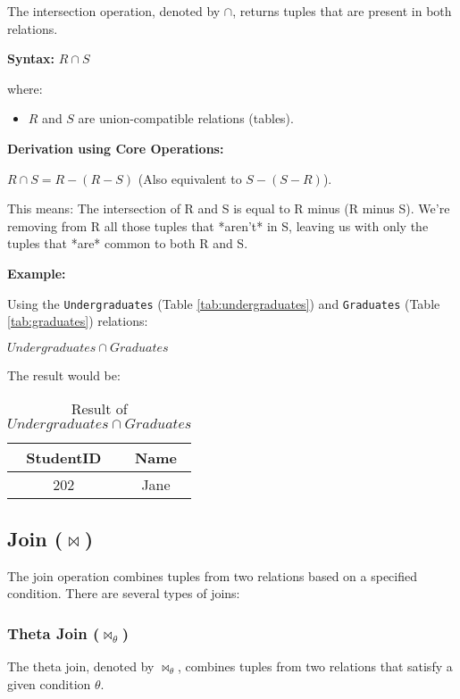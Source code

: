 \documentclass[12pt]{book}
\begin{document}
The intersection operation, denoted by $\cap$, returns tuples that are present in both relations.

\textbf{Syntax:} $\mathit{R} \cap \mathit{S}$

where:
\begin{itemize}
    \item $\mathit{R}$ and $\mathit{S}$ are union-compatible relations (tables).
\end{itemize}

\textbf{Derivation using Core Operations:}

$\mathit{R} \cap \mathit{S} = \mathit{R} - (\mathit{R} - \mathit{S})$
(Also equivalent to $\mathit{S} - (\mathit{S} - \mathit{R})$). %

This means: The intersection of R and S is equal to R minus (R minus S). We're removing from R all those tuples that *aren't* in S, leaving us with only the tuples that *are* common to both R and S.

\textbf{Example:}

Using the \texttt{Undergraduates} (Table \ref{tab:undergraduates}) and \texttt{Graduates} (Table \ref{tab:graduates}) relations:

$\mathit{Undergraduates} \cap \mathit{Graduates}$

The result would be:

\begin{table}[htbp]
\centering
\begin{tabular}{@{}cc@{}}
\toprule
StudentID & Name \\
\midrule
202 & Jane \\
\bottomrule
\end{tabular}
\caption{Result of $\mathit{Undergraduates} \cap \mathit{Graduates}$}
\label{tab:intersection_result}
\end{table}

\subsection{Join ($\Join$)}

The join operation combines tuples from two relations based on a specified condition. There are several types of joins:

\subsubsection{Theta Join ($\Join_\theta$)}

The theta join, denoted by $\Join_\theta$, combines tuples from two relations that satisfy a given condition $\theta$.
\end{document}
